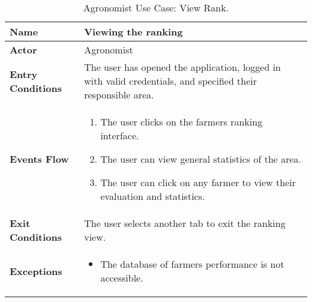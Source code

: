 
\begin{table}[hbt!]
\centering
\small
\caption{\label{tab:agrViewRank}Agronomist Use Case: View Rank.}

\begin{tabular}{|l|>{\raggedright\arraybackslash}m{12cm}|}

    \hline
    \textbf{Name} & Viewing the ranking\\
    \hline
   	\textbf{Actor} & Agronomist\\
    \hline
    
    \textbf{Entry Conditions} & The user has opened the application, logged in with valid credentials, and specified their responsible area. \\
    \hline
    \textbf{Events Flow} & \begin{enumerate}
            \item The user clicks on the farmers ranking interface.
            \item The user can view general statistics of the area.
            \item The user can click on any farmer to view their evaluation and statistics.
       \end{enumerate}\\
    \hline
    \textbf{Exit Conditions} & The user selects another tab to exit the ranking view.\\
    \hline
    \textbf{Exceptions} & 
       \begin{itemize}
          \item The database of farmers performance is not accessible.%
        \end{itemize}
     \\
    \hline
\end{tabular}
\end{table}